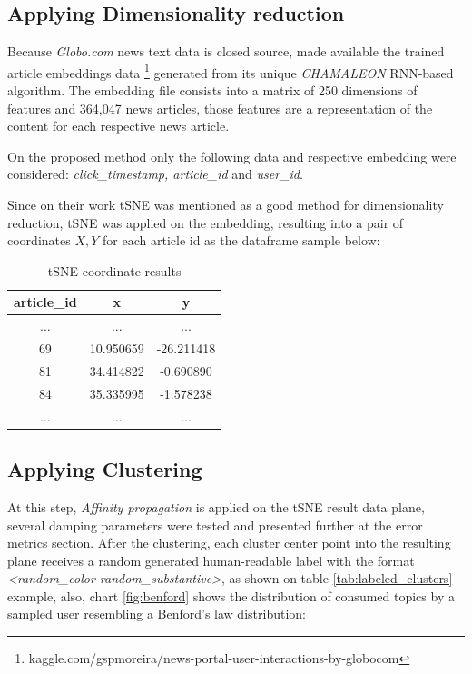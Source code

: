 \documentclass[ecp,tc,english]{iiufrgs}
\begin{document}
        \subsection{Applying Dimensionality reduction}
        Because \textit{Globo.com} news text data is closed source, \cite{moreira2018chameleon} made available the trained article embeddings data \footnote{kaggle.com/gspmoreira/news-portal-user-interactions-by-globocom} generated from its unique \textit{CHAMALEON} RNN-based algorithm. The embedding file consists into a matrix of 250 dimensions of features and 364,047 news articles, those features are a representation of the content for each respective news article.
    
        On the proposed method only the following data and respective embedding were considered: \textit{click\_timestamp, article\_id} and \textit{{}user\_id}.
        
    
        Since on their work tSNE was mentioned as a good method for dimensionality reduction, tSNE was applied on the embedding, resulting into a pair of coordinates \(X, Y\) for each article id as the dataframe sample below:
        
        \begin{table}[H]
            \centering
            \begin{tabular}{ |c|c|c| } 
                \hline
                article\_id & x & y \\
                \hline 
                ... & ... & ... \\
                69 & 10.950659 & -26.211418 \\ 
                81 & 34.414822 & -0.690890 \\ 
                84 & 35.335995 & -1.578238 \\ 
                ... & ... & ... \\
                \hline
            \end{tabular}
            \caption{tSNE coordinate results}
            \label{tab:tsne_results}
        \end{table}
        
        \newpage
        
        \subsection{Applying Clustering}
        At this step, \textit{Affinity propagation} is applied on the tSNE result data plane, several damping parameters were tested and presented further at the error metrics section. 
        After the clustering, each cluster center point into the resulting plane receives a random generated human-readable label with the format \textit{<random\_color-random\_substantive>}, as shown on table \ref{tab:labeled_clusters} example, also, chart \ref{fig:benford} shows the distribution of consumed topics by a sampled user resembling a Benford's law distribution:
        
\end{document}
